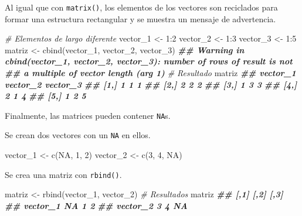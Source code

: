 \documentclass[
]{book}
\newenvironment{Shaded}{\begin{snugshade}}{\end{snugshade}}
\newcommand{\CommentTok}[1]{\textcolor[rgb]{0.56,0.35,0.01}{\textit{#1}}}
\newcommand{\ConstantTok}[1]{\textcolor[rgb]{0.00,0.00,0.00}{#1}}
\newcommand{\DecValTok}[1]{\textcolor[rgb]{0.00,0.00,0.81}{#1}}
\newcommand{\DocumentationTok}[1]{\textcolor[rgb]{0.56,0.35,0.01}{\textbf{\textit{#1}}}}
\newcommand{\FunctionTok}[1]{\textcolor[rgb]{0.00,0.00,0.00}{#1}}
\newcommand{\NormalTok}[1]{#1}
\newcommand{\OtherTok}[1]{\textcolor[rgb]{0.56,0.35,0.01}{#1}}
\newcommand{\SpecialCharTok}[1]{\textcolor[rgb]{0.00,0.00,0.00}{#1}}
\begin{document}
Al igual que con \texttt{matrix()}, los elementos de los vectores son reciclados para formar una estructura rectangular y se muestra un mensaje de advertencia.

\begin{Shaded}
\begin{Highlighting}[]
\CommentTok{\# Elementos de largo diferente}
\NormalTok{vector\_1 }\OtherTok{\textless{}{-}} \DecValTok{1}\SpecialCharTok{:}\DecValTok{2}
\NormalTok{vector\_2 }\OtherTok{\textless{}{-}} \DecValTok{1}\SpecialCharTok{:}\DecValTok{3}
\NormalTok{vector\_3 }\OtherTok{\textless{}{-}} \DecValTok{1}\SpecialCharTok{:}\DecValTok{5}
\NormalTok{matriz }\OtherTok{\textless{}{-}} \FunctionTok{cbind}\NormalTok{(vector\_1, vector\_2, vector\_3)}
\DocumentationTok{\#\# Warning in cbind(vector\_1, vector\_2, vector\_3): number of rows of result is not}
\DocumentationTok{\#\# a multiple of vector length (arg 1)}
\CommentTok{\# Resultado}
\NormalTok{matriz}
\DocumentationTok{\#\#      vector\_1 vector\_2 vector\_3}
\DocumentationTok{\#\# [1,]        1        1        1}
\DocumentationTok{\#\# [2,]        2        2        2}
\DocumentationTok{\#\# [3,]        1        3        3}
\DocumentationTok{\#\# [4,]        2        1        4}
\DocumentationTok{\#\# [5,]        1        2        5}
\end{Highlighting}
\end{Shaded}

Finalmente, las matrices pueden contener \texttt{NA}s.

Se crean dos vectores con un \texttt{NA} en ellos.

\begin{Shaded}
\begin{Highlighting}[]
\NormalTok{vector\_1 }\OtherTok{\textless{}{-}} \FunctionTok{c}\NormalTok{(}\ConstantTok{NA}\NormalTok{, }\DecValTok{1}\NormalTok{, }\DecValTok{2}\NormalTok{)}
\NormalTok{vector\_2 }\OtherTok{\textless{}{-}} \FunctionTok{c}\NormalTok{(}\DecValTok{3}\NormalTok{,  }\DecValTok{4}\NormalTok{, }\ConstantTok{NA}\NormalTok{)}
\end{Highlighting}
\end{Shaded}

Se crea una matriz con \texttt{rbind()}.

\begin{Shaded}
\begin{Highlighting}[]
\NormalTok{matriz }\OtherTok{\textless{}{-}} \FunctionTok{rbind}\NormalTok{(vector\_1, vector\_2)}
\CommentTok{\# Resultados}
\NormalTok{matriz}
\DocumentationTok{\#\#          [,1] [,2] [,3]}
\DocumentationTok{\#\# vector\_1   NA    1    2}
\DocumentationTok{\#\# vector\_2    3    4   NA}
\end{Highlighting}
\end{Shaded}
\end{document}
